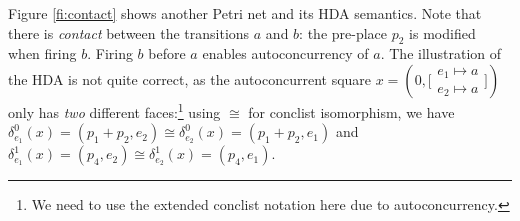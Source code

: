 \documentclass[runningheads,envcountsame]{llncs}
\newcommand*\sloset[1]{\big[\begin{smallmatrix}#1\end{smallmatrix}\big]}
\begin{document}
\begin{example}
  \label{ex:contact}
  Figure \ref{fi:contact} shows another Petri net and its HDA semantics.
  Note that there is \emph{contact} between the transitions $a$ and $b$:
  the pre-place $p_2$ is modified when firing $b$.
  Firing $b$ before $a$ enables autoconcurrency of $a$.
  The illustration of the HDA is not quite correct, as the autoconcurrent square $x=(0, \sloset{e_1\mapsto a\\e_2\mapsto a})$
  only has \emph{two} different faces:\footnote{We need to use the extended conclist notation here due to autoconcurrency.}
  using $\cong$ for conclist isomorphism,
  we have $\delta_{e_1}^0(x)=(p_1+p_2, e_2)\cong \delta_{e_2}^0(x)=(p_1+p_2, e_1)$
  and $\delta_{e_1}^1(x)=(p_4, e_2)\cong \delta_{e_2}^1(x)=(p_4, e_1)$.
\end{example}
\end{document}
